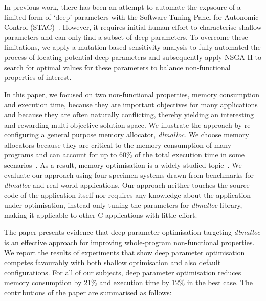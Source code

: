 In previous work, there has been an attempt to automate the expsoure of a limited form of `deep' parameters with the Software Tuning Panel for Autonomic Control (STAC)~\cite{Brake:2008:ADS:1370018.1370031}. However, it requires initial human effort to characterise shallow parameters and can only find a subset of deep parameters. To overcome these limitations, we apply a mutation-based sensitivity analysis to fully automated the process of locating potential deep parameters and subsequently apply NSGA II to search for optimal values for these parameters to balance non-functional properties of interest. 

In this paper, we focused on two non-functional properties, memory consumption and execution time, because they are important objectives for many applications and because they are often naturally conflicting, thereby yielding an interesting and rewarding multi-objective solution space. We illustrate the approach by re-configuring a general purpose memory allocator, \emph{dlmalloc}. We choose memory allocators because they are critical to the memory consumption of many programs and can account for up to 60\% of the total execution time in some scenarios~\cite{Zorn:1992:EMS:142181.142200}. As a result, memory optimisation is a widely studied topic~\cite{Risco-Martin:2009:ODM:1569901.1570116,RiscoMartin2010572}. We evaluate our approach using four specimen systems drawn from benchmarks for \emph{dlmalloc} and real world applications. Our approach neither touches the source code of the application itself nor requires any knowledge about the application under optimisation, instead only tuning the parameters for \emph{dlmalloc} library, making it applicable to other C applications with little effort.


The paper presents evidence that deep parameter optimisation targeting \emph{dlmalloc} is an effective approach for improving whole-program non-functional properties. 
We report the results of experiments that show deep parameter optimisation competes favourably with both shallow optimisation and also default configurations. For all of our subjects, deep parameter optimisation reduces memory consumption by 21\% and execution time by 12\% in the best case. The contributions of the paper are summarised as follows:


